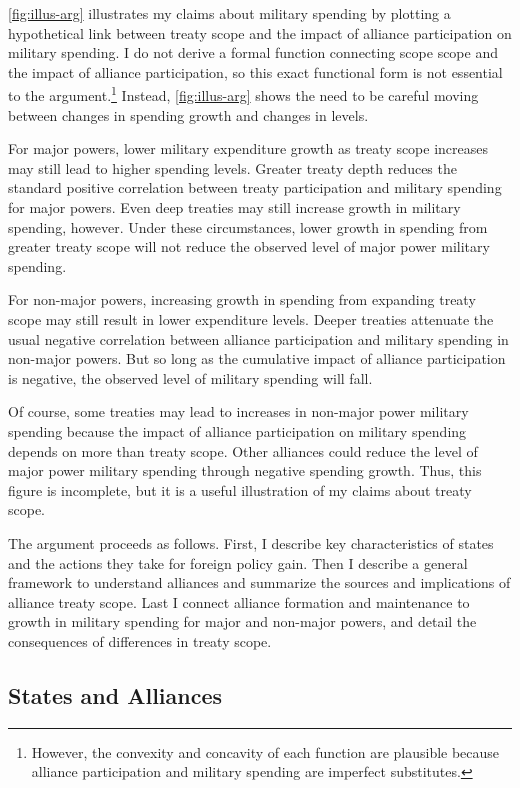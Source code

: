 \documentclass[12pt]{article}
\begin{document}
\autoref{fig:illus-arg} illustrates my claims about military spending by plotting a hypothetical link between treaty scope and the impact of alliance participation on military spending. 
I do not derive a formal function connecting scope scope and the impact of alliance participation, so this exact functional form is not essential to the argument.\footnote{However, the convexity and concavity of each function are plausible because alliance participation and military spending are imperfect substitutes.}  
Instead, \autoref{fig:illus-arg} shows the need to be careful moving between changes in spending growth and changes in levels. 


For major powers, lower military expenditure growth as treaty scope increases may still lead to higher spending levels. 
Greater treaty depth reduces the standard positive correlation between treaty participation and military spending for major powers. 
Even deep treaties may still increase growth in military spending, however. 
Under these circumstances, lower growth in spending from greater treaty scope will not reduce the observed level of major power military spending. 


For non-major powers, increasing growth in spending from expanding treaty scope may still result in lower expenditure levels. 
Deeper treaties attenuate the usual negative correlation between alliance participation and military spending in non-major powers. 
But so long as the cumulative impact of alliance participation is negative, the observed level of military spending will fall. 


Of course, some treaties may lead to increases in non-major power military spending because the impact of alliance participation on military spending depends on more than treaty scope. 
Other alliances could reduce the level of major power military spending through negative spending growth.
Thus, this figure is incomplete, but it is a useful illustration of my claims about treaty scope. 


The argument proceeds as follows.
First, I describe key characteristics of states and the actions they take for foreign policy gain. 
Then I describe a general framework to understand alliances and summarize the sources and implications of alliance treaty scope. 
Last I connect alliance formation and maintenance to growth in military spending for major and non-major powers, and detail the consequences of differences in treaty scope.  



\subsection{States and Alliances}
\end{document}
